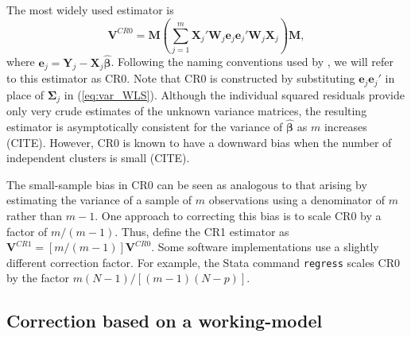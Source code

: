 \documentclass[12pt]{article}\usepackage[]{graphicx}\usepackage[]{color}
\newcommand{\bm}{\mathbf}
\newcommand{\bs}{\boldsymbol}
\begin{document}
The most widely used estimator is 
\begin{equation}
\label{eq:V_CR0}
\bm{V}^{CR0} = \bm{M}\left(\sum_{j=1}^m \bm{X}_j'\bm{W}_j \bm{e}_j \bm{e}_j'\bm{W}_j \bm{X}_j\right) \bm{M},
\end{equation}
where $\bm{e}_j = \bm{Y}_j - \bm{X}_j \bs{\hat\beta}$. Following the naming conventions used by \citet{Cameron2015practitioners}, we will refer to this estimator as CR0. 
Note that CR0 is constructed by substituting $\bm{e}_j \bm{e}_j'$ in place of $\bs\Sigma_j$ in (\ref{eq:var_WLS}). 
Although the individual squared residuals provide only very crude estimates of the unknown variance matrices, the resulting estimator is asymptotically consistent for the variance of $\bs{\hat\beta}$ as $m$ increases (CITE). 
However, CR0 is known to have a downward bias when the number of independent clusters is small (CITE).

The small-sample bias in CR0 can be seen as analogous to that arising by estimating the variance of a sample of $m$ observations using a denominator of $m$ rather than $m - 1$. 
One approach to correcting this bias is to scale CR0 by a factor of $m / (m - 1)$. Thus, define the CR1 estimator as $\bm{V}^{CR1} = [m / (m - 1)] \bm{V}^{CR0}$.
Some software implementations use a slightly different correction factor. 
For example, the Stata command \texttt{regress} scales CR0 by the factor $m (N - 1) / [(m - 1) (N - p)]$. 

\subsection{Correction based on a working-model}
\end{document}
